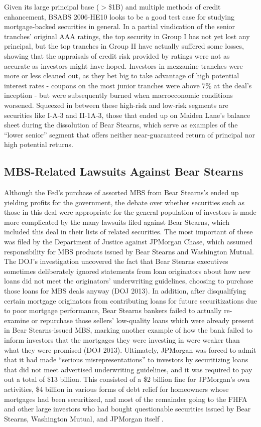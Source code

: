 \documentclass[12pt]{article}
\begin{document}
Given its large principal base ($>$\$1B) and multiple methods of credit enhancement, BSABS 2006-HE10 looks to be a good test case for studying mortgage-backed securities in general. In a partial vindication of the senior tranches’ original AAA ratings, the top security in Group I has not yet lost any principal, but the top tranches in Group II have actually suffered some losses, showing that the appraisals of credit risk provided by ratings were not as accurate as investors might have hoped. Investors in mezzanine tranches were more or less cleaned out, as they bet big to take advantage of high potential interest rates - coupons on the most junior tranches were above 7\% at the deal’s inception - but were subsequently burned when macroeconomic conditions worsened. Squeezed in between these high-risk and low-risk segments are securities like I-A-3 and II-1A-3, those that ended up on Maiden Lane’s balance sheet during the dissolution of Bear Stearns, which serve as examples of the “lower senior” segment that offers neither near-guaranteed return of principal nor high potential returns.

\subsection*{MBS-Related Lawsuits Against Bear Stearns}

Although the Fed’s purchase of assorted MBS from Bear Stearns’s ended up yielding profits for the government, the debate over whether securities such as those in this deal were appropriate for the general population of investors is made more complicated by the many lawsuits filed against Bear Stearns, which included this deal in their lists of related securities. The most important of these was filed by the Department of Justice against JPMorgan Chase, which assumed responsibility for MBS products issued by Bear Stearns and Washington Mutual. The DOJ’s investigation uncovered the fact that Bear Stearns executives sometimes deliberately ignored statements from loan originators about how new loans did not meet the originators’ underwriting guidelines, choosing to purchase those loans for MBS deals anyway (DOJ 2013). In addition, after disqualifying certain mortgage originators from contributing loans for future securitizations due to poor mortgage performance, Bear Stearns bankers failed to actually re-examine or repurchase those sellers’ low-quality loans which were already present in Bear Stearns-issued MBS, marking another example of how the bank failed to inform investors that the mortgages they were investing in were weaker than what they were promised (DOJ 2013). Ultimately, JPMorgan was forced to admit that it had made “serious misrepresentations” to investors by securitizing loans that did not meet advertised underwriting guidelines, and it was required to pay out a total of \$13 billion. This consisted of a \$2 billion fine for JPMorgan’s own activities, \$4 billion in various forms of debt relief for homeowners whose mortgages had been securitized, and most of the remainder going to the FHFA and other large investors who had bought questionable securities issued by Bear Stearns, Washington Mutual, and JPMorgan itself \parencite{eavis13}. 
\end{document}
